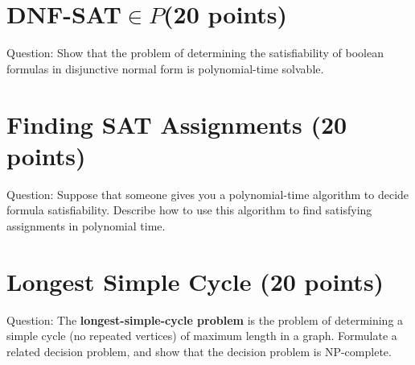 \documentclass{article}
\begin{document}
\section{DNF-SAT$\in{P}$(20 points)}
Question: Show that the problem of determining the satisfiability of boolean formulas in disjunctive normal form is polynomial-time solvable.


\section{Finding SAT Assignments (20 points)}
Question: Suppose that someone gives you a polynomial-time algorithm to decide formula satisfiability. Describe how to use this algorithm to find satisfying assignments in polynomial time.


\section{Longest Simple Cycle (20 points)}
Question: The \textbf{longest-simple-cycle problem} is the problem of determining a simple cycle (no repeated vertices) of maximum length in a graph. Formulate a related decision problem, and show that the decision problem is NP-complete.
\end{document}
